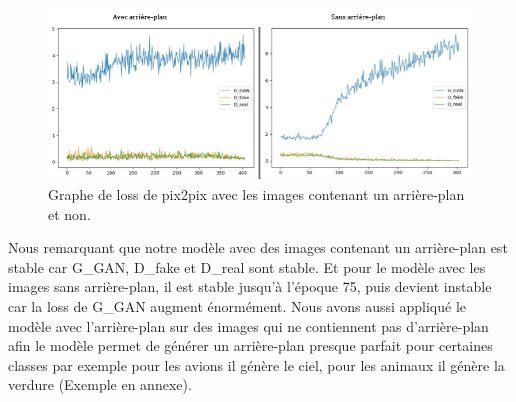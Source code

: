 \begin{figure}[H] 
	\centering 
	\includegraphics[width=1.0\textwidth]{./resources/img/im_pascal_loss.png} %
	\caption{Graphe de loss de pix2pix avec les images contenant un arrière-plan et non.} %
	\label{Fig4_2} %
\end{figure}

Nous remarquant que notre modèle avec des images contenant un arrière-plan est stable car G{\_}GAN, D{\_}fake et D{\_}real sont stable. Et pour le modèle avec les images sans arrière-plan, il est stable jusqu'à l'époque 75, puis devient instable car la loss de G{\_}GAN augment énormément.
Nous avons aussi appliqué le modèle avec l'arrière-plan sur des images qui ne contiennent pas d'arrière-plan afin le modèle permet de générer un arrière-plan presque parfait pour certaines classes par exemple pour les avions il génère le ciel, pour les animaux il génère la verdure (Exemple en annexe).
